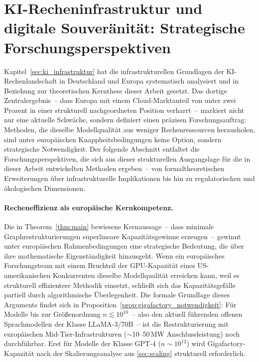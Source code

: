 ﻿\documentclass[12pt, a4paper, openany]{report}
\begin{document}
\section{KI-Recheninfrastruktur und digitale Souveränität:
  Strategische Forschungsperspektiven}
\label{sec:outlook_infrastruktur}

Kapitel~\ref{sec:ki_infrastruktur} hat die infrastrukturellen Grundlagen
der KI-Rechenlandschaft in Deutschland und Europa systematisch analysiert
und in Beziehung zur theoretischen Kernthese dieser Arbeit gesetzt.  Das
dortige Zentralergebnis~-- dass Europa mit einem Cloud-Marktanteil von
unter zwei Prozent in einer strukturell nachgeordneten Position verharrt~--
markiert nicht nur eine aktuelle Schwäche, sondern definiert einen
präzisen Forschungsauftrag: Methoden, die dieselbe Modellqualität aus
weniger Rechenressourcen herausholen, sind unter europäischen
Knappheitsbedingungen keine Option, sondern strategische Notwendigkeit.
Der folgende Abschnitt entfaltet die Forschungsperspektiven, die sich aus
dieser strukturellen Ausgangslage für die in dieser Arbeit entwickelten
Methoden ergeben~-- von formaltheoretischen Erweiterungen über
infrastrukturelle Implikationen bis hin zu regulatorischen und
ökologischen Dimensionen.

\paragraph{Recheneffizienz als europäische Kernkompetenz.}
Die in Theorem~\ref{thm:main} bewiesene Kernaussage~-- dass minimale
Graphrestrukturierungen superlineare Kapazitätsgewinne erzeugen~-- gewinnt
unter europäischen Rahmenbedingungen eine strategische Bedeutung, die über
ihre mathematische Eigenständigkeit hinausgeht.  Wenn ein europäisches
Forschungsteam mit einem Bruchteil der GPU-Kapazität eines US-amerikanischen
Konkurrenten dieselbe Modellqualität erreichen kann, weil es strukturell
effizientere Methodik einsetzt, schließt sich das Kapazitätsgefälle
partiell durch algorithmische Überlegenheit.  Die formale Grundlage dieses
Arguments findet sich in Proposition~\ref{prop:gigafactory_notwendigkeit}:
Für Modelle bis zur Größenordnung $n \lesssim 10^{10}$~-- also den aktuell
führenden offenen Sprachmodellen der Klasse LLaMA-3/70B~-- ist die
Restrukturierung mit europäischen Mid-Tier-Infrastrukturen
($\sim$10--50\,MW Anschlussleistung) noch durchführbar.  Erst für Modelle
der Klasse GPT-4 ($n \sim 10^{12}$) wird Gigafactory-Kapazität nach der
Skalierungsanalyse aus \cref{sec:scaling} strukturell erforderlich.
\end{document}

